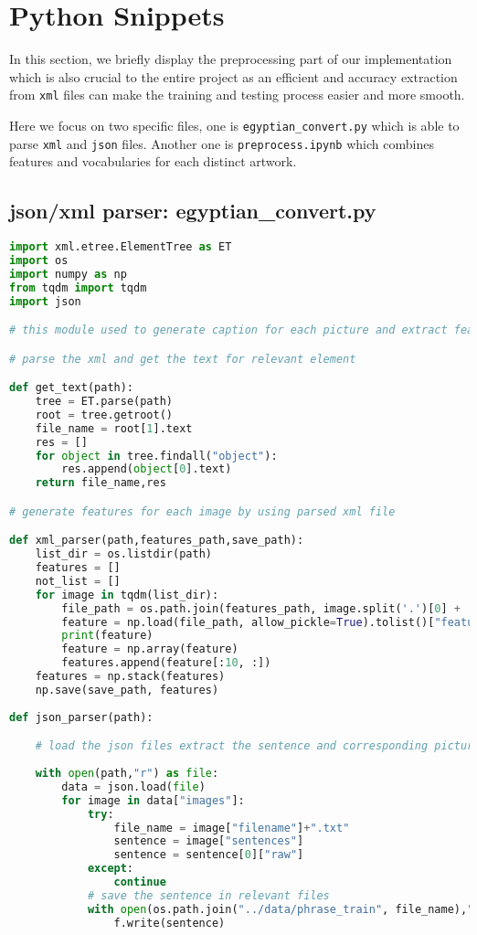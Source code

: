 
\section{Python Snippets}
In this section, we briefly display the preprocessing part of our implementation which is also crucial to the entire project as an efficient and accuracy extraction from \verb|xml| files can make the training and testing process easier and more smooth.

Here we focus on two specific files, one is \verb|egyptian_convert.py| which is able to parse \verb|xml| and \verb|json| files. Another one is \verb|preprocess.ipynb| which combines features and vocabularies for each distinct artwork.


\subsection{json/xml parser: egyptian\_convert.py}

\begin{lstlisting}[language=Python]
import xml.etree.ElementTree as ET
import os
import numpy as np
from tqdm import tqdm
import json

# this module used to generate caption for each picture and extract features base on the corresponding caption

# parse the xml and get the text for relevant element

def get_text(path):
    tree = ET.parse(path)
    root = tree.getroot()
    file_name = root[1].text
    res = []
    for object in tree.findall("object"):
        res.append(object[0].text)
    return file_name,res

# generate features for each image by using parsed xml file

def xml_parser(path,features_path,save_path):
    list_dir = os.listdir(path)
    features = []
    not_list = []
    for image in tqdm(list_dir):
        file_path = os.path.join(features_path, image.split('.')[0] + '.npy')
        feature = np.load(file_path, allow_pickle=True).tolist()["features"]
        print(feature)
        feature = np.array(feature)
        features.append(feature[:10, :])
    features = np.stack(features)
    np.save(save_path, features)
    
def json_parser(path):

    # load the json files extract the sentence and corresponding picture name.
    
    with open(path,"r") as file:
        data = json.load(file)
        for image in data["images"]:
            try:
                file_name = image["filename"]+".txt"
                sentence = image["sentences"]
                sentence = sentence[0]["raw"]
            except:
                continue
            # save the sentence in relevant files
            with open(os.path.join("../data/phrase_train", file_name),"w") as f:
                f.write(sentence)
                
\end{lstlisting}

